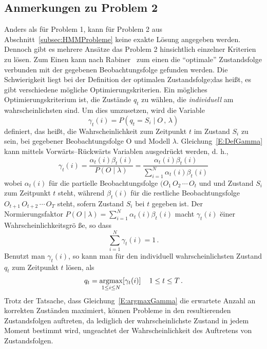 \subsection{Anmerkungen zu Problem 2}
Anders als f\"ur Problem 1, kann f\"ur Problem 2 aus Abschnitt~\ref{subsec:HMMProbleme} keine exakte L\"osung angegeben werden. Dennoch gibt es mehrere Ans\"atze das Problem 2 hinsichtlich einzelner Kriterien zu l\"osen. Zum Einen kann nach Rabiner~\cite{bib:hmmrabiner} zum einen die \enquote{optimale} Zustandsfolge verbunden mit der gegebenen Beobachtungsfolge gefunden werden. Die Schwierigkeit liegt bei der Definition der optimalen Zustandsfolge;das hei\ss t, es gibt verschiedene m\"ogliche Optimierungskriterien. Ein m\"ogliches Optimierungskriterium ist, die Zust\"ande $q_t$ zu w\"ahlen, die \textit{individuell} am wahrscheinlichsten sind. Um dies umzusetzen, wird die Variable
\begin{equation}
\label{E:DefGamma}
\gamma_t(i) = P (q_t = S_i \mid O \, , \, \lambda)
\end{equation}
definiert, das hei\ss t, die Wahrscheinlichkeit zum Zeitpunkt $t$ im Zustand $S_i$ zu sein, bei gegebener Beobachtungsfolge O und Modell $\lambda$. Gleichung~\ref{E:DefGamma} kann mittels Vorw\"arts--R\"uckw\"arts Variablen ausgedr\"uckt werden, d. h.,
\begin{equation}
\label{E:FracGamma}
\gamma_t(i) = \frac{\alpha_t(i) \beta_t(i)}{P (O  \mid \lambda)} = \frac{\alpha_t(i) \beta_t(i)}{\sum_{i = 1}^{N} \alpha_t(i) \beta_t(i)}
\end{equation}
wobei $\alpha_t(i)$ f\"ur die partielle Beobachtungsfolge $(O_1 \, O_2 \, \cdots \, O_t$  und  und Zustand $S_i$ zum Zeitpunkt $t$ steht, w\"ahrend $\beta_t(i)$ f\"ur die restliche Beobachtungsfolge $O_{t +1} \, O_{t + 2} \, \cdots \, O_T$ steht, sofern Zustand $S_i$ bei $t$ gegeben ist. Der Normierungsfaktor $P (O  \mid \lambda) = \sum_{i = 1}^{N} \alpha_t(i) \beta_t(i)$ macht $\gamma_t(i)$ \u einer Wahrscheinlichkeitsgr\"o \ss e, so dass 
\begin{equation}
\sum_{i = 1}^{N} \gamma_t(i) = 1 \, .
\end{equation}
Benutzt man $ \gamma_t(i)$, so kann man f\"ur den individuell wahrscheinlichsten Zustand $q_t$ zum Zeitpunkt $t$ l\"osen, als
\begin{align}
\label{E:argmaxGamma}
q_t =  \underset{1 \leq i \leq N}{\operatorname*{argmax}} [\gamma_t(i)] \, & & 1 \leq t \leq T \, .
\end{align}
Trotz der Tatsache, dass Gleichung~\ref{E:argmaxGamma} die erwartete Anzahl an korrekten Zust\"anden maximiert, k\"onnen Probleme in den resultierenden Zustandsfolgen auftreten, da lediglich der wahrscheinlichste Zustand in jedem Moment bestimmt wird, ungeachtet der Wahrscheinlichkeit des Auftretens von Zustandsfolgen.
